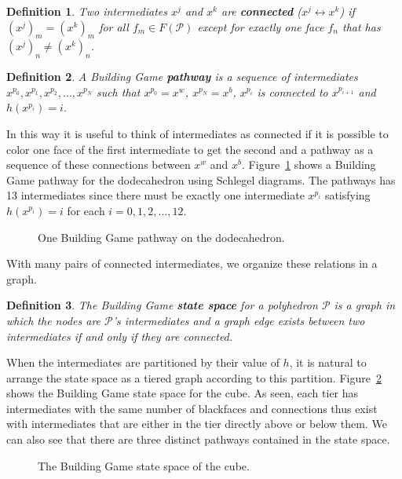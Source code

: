 \documentclass[12pt]{article}
\newtheorem{mydef}{Definition}
\newcommand{\colorB}{black}
\newcommand{\colorAsm}{w}
\newcommand{\colorBsm}{b}
\newcommand{\poly}{$\mathscr{P}$}
\newcommand{\faceset}{F\left(\mathscr{P}\right)}
\newcommand{\spc}{ }
\begin{document}
\begin{mydef}
Two intermediates $x^j$ and $x^k$ are \textbf{connected} ($x^j \leftrightarrow x^k$) if $\left(x^j\right)_m = \left(x^k\right)_m$ for all $f_m \in \faceset$ except for exactly one face $f_n$ that has  $\left(x^j\right)_n \neq \left(x^k\right)_n$.
\end{mydef}
\begin{mydef}
A Building Game \textbf{pathway} is a sequence of intermediates $x^{p_0}, x^{p_1}, x^{p_2}, \dots, x^{p_N}$ such that $x^{p_0} = x^\colorAsm$, $x^{p_N} = x^\colorBsm$, $x^{p_i}$ is connected to $x^{p_{i+1}}$ and $h\left(x^{p_i}\right) = i$.
\end{mydef}

In this way it is useful to think of intermediates as connected if it is possible to color one face of the first intermediate to get the second and a pathway as a sequence of these connections between $x^\colorAsm$ and $x^\colorBsm$. Figure~\ref{fig:DodecBG} shows a Building Game pathway for the dodecahedron using Schlegel diagrams. The pathways has 13 intermediates since there must be exactly one intermediate $x^{p_i}$ satisfying $h\left(x^{p_i}\right) = i$ for each $i = 0,1,2,\dots,12$.

\begin{figure}[ht]
\caption{One Building Game pathway on the dodecahedron.}
\label{fig:DodecBG}
\end{figure}

With many pairs of connected intermediates, we organize these relations in a graph.

\begin{mydef}
The Building Game \textbf{state space} for a polyhedron \poly\spc is a graph in which the nodes are \poly's intermediates and a graph edge exists between two intermediates if and only if they are connected. 
\end{mydef}

When the intermediates are partitioned by their value of $h$, it is natural to arrange the state space as a tiered graph according to this partition. Figure~\ref{fig:CubeSS} shows the Building Game state space for the cube. As seen, each tier has intermediates with the same number of \colorB faces and connections thus exist with intermediates that are either in the tier directly above or below them. We can also see that there are three distinct pathways contained in the state space. 

\begin{figure}[ht]
\caption{The Building Game state space of the cube.}
\label{fig:CubeSS}
\end{figure}
\end{document}
